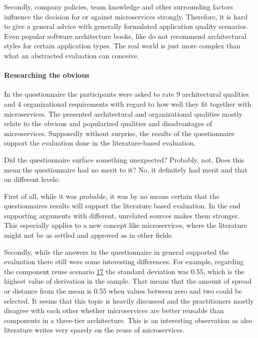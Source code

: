Secondly, company policies, team knowledge and other surrounding factors influence the decision for or against microservices strongly.
Therefore, it is hard to give a general advice with generally formulated application quality scenarios.
Even popular software architecture books, like \citep{Bass2012} do not recommend architectural styles for certain application types. 
The real world is just more complex than what an abstracted evaluation can conceive.

\paragraph{Researching the obvious}
In the questionnaire the participants were asked to rate 9 architectural qualities and 4 organizational requirements with regard to how well they fit together with microservices.
The presented architectural and organizational qualities mostly relate to the obvious and popularized qualities and disadvantages of microservices.
Supposedly without surprise, the results of the questionnaire support the evaluation done in the literature-based evaluation.

Did the questionnaire surface something unexpected? Probably, not.
Does this mean the questionnaire had no merit to it? No, it definitely had merit and that on different levels:

First of all, while it was probable, it was by no means certain that the questionnaires results will support the literature based evaluation.
In the end supporting arguments with different, unrelated sources makes them stronger.
This especially applies to a new concept like microservices, where the literature might not be as settled and approved as in other fields.
 
Secondly, while the answers in the questionnaire in general supported the evaluation there still were some interesting differences.
For example, regarding the component reuse scenario \hyperref[quaMicro:s17]{17} the standard deviation was 0.55, which is the highest value of derivation in the sample. 
That means that the amount of spread or distance from the mean is 0.55 when values between zero and two could be selected.
It seems that this topic is heavily discussed and the practitioners mostly disagree with each other whether microservices are better reusable than components in a three-tier architecture. 
This is an interesting observation as also literature writes very sparely on the reuse of microservices.

